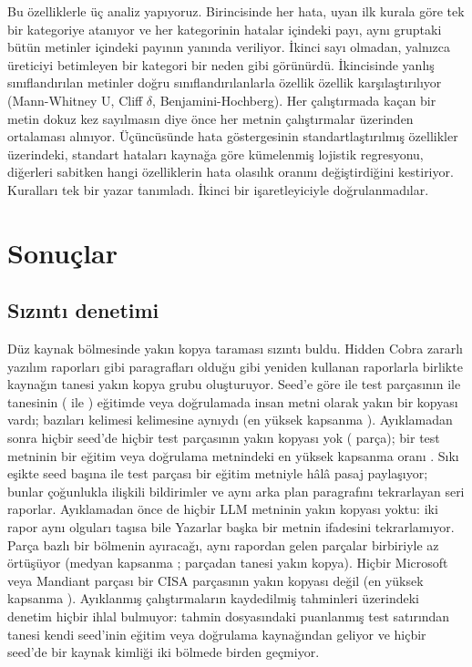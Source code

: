 \documentclass[journal]{IEEEtran}
\begin{document}
Bu özelliklerle üç analiz yapıyoruz. Birincisinde her hata, uyan ilk kurala göre tek bir kategoriye atanıyor ve her
kategorinin hatalar içindeki payı, aynı gruptaki bütün metinler içindeki payının yanında veriliyor. İkinci sayı
olmadan, yalnızca üreticiyi betimleyen bir kategori bir neden gibi görünürdü. İkincisinde yanlış sınıflandırılan
metinler doğru sınıflandırılanlarla özellik özellik karşılaştırılıyor (Mann-Whitney U, Cliff $\delta$,
Benjamini-Hochberg). Her çalıştırmada kaçan bir metin dokuz kez sayılmasın diye önce her metnin çalıştırmalar
üzerinden ortalaması alınıyor. Üçüncüsünde hata göstergesinin standartlaştırılmış özellikler üzerindeki, standart
hataları kaynağa göre kümelenmiş lojistik regresyonu, diğerleri sabitken hangi özelliklerin hata olasılık oranını
değiştirdiğini kestiriyor. Kuralları tek bir yazar tanımladı. İkinci bir işaretleyiciyle doğrulanmadılar.

\section{Sonuçlar}\label{sec:results}



\subsection{Sızıntı denetimi}\label{sec:leakage}
Düz kaynak bölmesinde yakın kopya taraması sızıntı buldu. Hidden Cobra zararlı yazılım raporları gibi paragrafları
olduğu gibi yeniden kullanan raporlarla birlikte \LeakNSources{} kaynağın \LeakDupSources{} tanesi \LeakDupGroups{}
yakın kopya grubu oluşturuyor. Seed'e göre \LeakPlainTestChunksMin{} ile \LeakPlainTestChunksMax{} test parçasının
\LeakPlainChunksDupMin{} ile \LeakPlainChunksDupMax{} tanesinin (\LeakPlainDupShareMin{} ile \LeakPlainDupShareMax{})
eğitimde veya doğrulamada insan metni olarak yakın bir kopyası vardı; bazıları kelimesi kelimesine aynıydı (en
yüksek kapsanma \LeakPlainMaxContainment{}). Ayıklamadan sonra hiçbir seed'de hiçbir test parçasının yakın kopyası
yok (\LeakPurgedChunksDupMax{} parça); bir test metninin bir eğitim veya doğrulama metnindeki en yüksek kapsanma oranı
\LeakPurgedMaxContainment{}. Sıkı eşikte seed başına \LeakPurgedChunksStrictMin{} ile \LeakPurgedChunksStrictMax{}
test parçası bir eğitim metniyle hâlâ pasaj paylaşıyor; bunlar çoğunlukla ilişkili bildirimler ve aynı arka plan
paragrafını tekrarlayan seri raporlar. Ayıklamadan önce de hiçbir LLM metninin yakın kopyası yoktu: iki rapor aynı
olguları taşısa bile Yazarlar başka bir metnin ifadesini tekrarlamıyor. Parça bazlı bir bölmenin ayıracağı, aynı
rapordan gelen parçalar birbiriyle az örtüşüyor (medyan kapsanma \LeakSiblingMedian{}; \LeakNSiblings{} parçadan
\LeakSiblingDup{} tanesi yakın kopya). Hiçbir Microsoft veya Mandiant parçası bir CISA parçasının yakın kopyası değil
(en yüksek kapsanma \LeakVendorMax{}). Ayıklanmış çalıştırmaların kaydedilmiş tahminleri üzerindeki denetim hiçbir
ihlal bulmuyor: \LeakAuditFiles{} tahmin dosyasındaki \LeakAuditRows{} puanlanmış test satırından
\LeakAuditBad{} tanesi kendi seed'inin eğitim veya doğrulama kaynağından geliyor ve hiçbir seed'de bir kaynak kimliği
iki bölmede birden geçmiyor.
\end{document}
